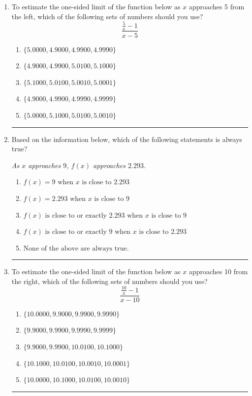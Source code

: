 \documentclass[14pt]{extbook}
\newcommand{\litem}[1]{\item#1\hspace*{-1cm}\rule{\textwidth}{0.4pt}}
\begin{document}
\begin{enumerate}
{\begin{enumerate}[label=\Alph*.]
\end{enumerate} }
\litem{
To estimate the one-sided limit of the function below as $x$ approaches 5 from the left, which of the following sets of numbers should you use?\[ \frac{\frac{5}{x} - 1}{x - 5} \]\begin{enumerate}[label=\Alph*.]
\item \( \{ 5.0000, 4.9000, 4.9900, 4.9990 \} \)
\item \( \{ 4.9000, 4.9900, 5.0100, 5.1000 \} \)
\item \( \{ 5.1000, 5.0100, 5.0010, 5.0001 \} \)
\item \( \{ 4.9000, 4.9900, 4.9990, 4.9999 \} \)
\item \( \{ 5.0000, 5.1000, 5.0100, 5.0010 \} \)

\end{enumerate} }
\litem{
Based on the information below, which of the following statements is always true?
\begin{center}
    \textit{ As $x$ approaches $9$, $f(x)$ approaches $2.293$. }
\end{center}
\begin{enumerate}[label=\Alph*.]
\item \( f(x) = 9 \text{ when } x \text{ is close to } 2.293 \)
\item \( f(x) = 2.293 \text{ when } x \text{ is close to } 9 \)
\item \( f(x) \text{ is close to or exactly } 2.293 \text{ when } x \text{ is close to } 9 \)
\item \( f(x) \text{ is close to or exactly } 9 \text{ when } x \text{ is close to } 2.293 \)
\item \( \text{None of the above are always true.} \)

\end{enumerate} }
\litem{
To estimate the one-sided limit of the function below as $x$ approaches 10 from the right, which of the following sets of numbers should you use?\[ \frac{\frac{10}{x} - 1}{x - 10} \]\begin{enumerate}[label=\Alph*.]
\item \( \{ 10.0000, 9.9000, 9.9900, 9.9990 \} \)
\item \( \{ 9.9000, 9.9900, 9.9990, 9.9999 \} \)
\item \( \{ 9.9000, 9.9900, 10.0100, 10.1000 \} \)
\item \( \{ 10.1000, 10.0100, 10.0010, 10.0001 \} \)
\item \( \{ 10.0000, 10.1000, 10.0100, 10.0010 \} \)


\end{enumerate}}
\end{enumerate}
\end{document}
